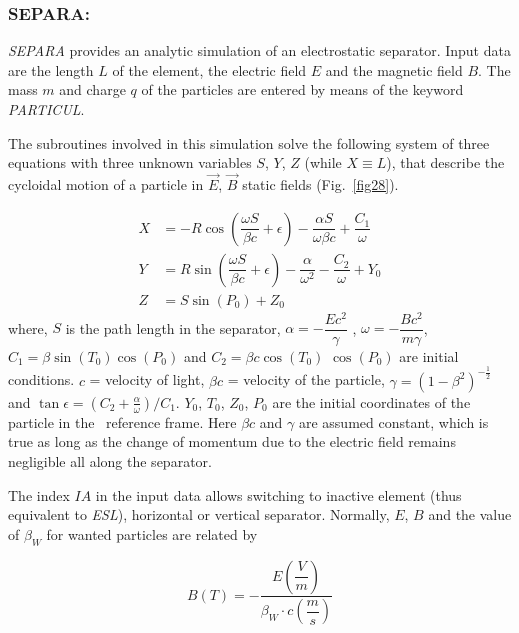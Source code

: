 \newpage

\subsubsection*{SEPARA: \SEPARATitl}\label{SEPARA} 

\textsl{SEPARA}  provides an analytic simulation of an electrostatic separator. 
Input data are the length $ L $ of the element, the electric field $ E $ and
the magnetic field $ B $. The mass $ m $ and charge $ q $ of the particles are
entered by means of the keyword \textsl{PARTICUL}.  
\medskip

\noindent The subroutines involved in this simulation solve the following
system of three equations with three unknown variables $ S$, $Y$, $Z $ (while  $ X\equiv L $), that 
describe the cycloidal motion of a particle in $ \vec  E$,  $ \vec  B $ static
fields (Fig.~\ref{fig28}).   

\begin{align*}
	X &   =   -R  \cos \left( \dfrac{\omega S }{ \beta c} + \epsilon \right) 
	         -  \dfrac{\alpha S }{ \omega\beta c} + \dfrac{C_1 }{ \omega} \\
	Y &   =     R \sin  \left(\dfrac{\omega S }{ \beta c} + \epsilon \right) - 
	         \dfrac{\alpha }{ \omega^ 2} - \dfrac{C_2 }{ \omega}  + Y_0  \\
	Z &   =  S \sin (P_0)+Z_0   
\end{align*}
%
 where, $ S $ is the path length in the separator, $\alpha =-\dfrac{Ec^2 }{ \gamma}$ ,
   $   \omega =-\dfrac{Bc^2 }{m\gamma}$, $   C_1=\beta \sin (T_0) \cos (P_0) $ 
and $ C_2=\beta c  \cos (T_0) $ $ \cos (P_0) $ are initial conditions. 
$c$ = velocity of light, $ \beta c$ = velocity of the particle,  
$ \gamma =(1-\beta^ 2)^{-\frac{1 }{ 2}} $ 
and  $\tan \epsilon  =   (C_2+ \frac{\alpha}{\omega})/C_1 $.   $ Y_0$,   $ T_0$,  
$Z_0$,  $ P_0 $ are the initial 
coordinates of the particle in the \zgou\ reference  frame.  Here 
$\beta c $ and $\gamma$ are assumed constant, which is true as long as the change of momentum
due to the electric field remains negligible all along the separator.  
\medskip

\noindent The index $IA$ in the input data allows switching to inactive
element (thus equivalent to \textsl{ESL}), horizontal or vertical separator.  
Normally, $ E$,  $B $ and the value of $ \beta_W $ for wanted particles are related by 

$$ B(T) = - \dfrac{E\left(\dfrac{V }{ m}\right) }{ \beta_ W\cdot c\left(\dfrac{m }{ s}\right)} $$

